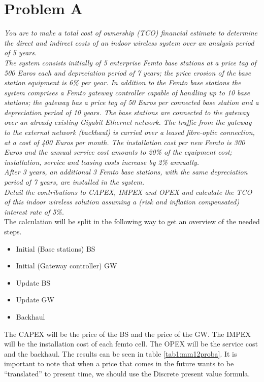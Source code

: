 \section{Problem A}
\textit{You are to make a total cost of ownership (TCO) financial estimate to determine the direct and indirect costs of an indoor wireless system over an analysis period of 5 years.}\\

\textit{The system consists initially of 5 enterprise Femto base stations at a price tag of 500 Euros each and depreciation period of 7 years; the price erosion of the base station equipment is 6\% per year. In addition to the Femto base stations the system comprises a Femto gateway controller capable of handling up to 10 base stations; the gateway has a price tag of 50 Euros per connected base station and a depreciation period of 10 years. The base stations are connected to the gateway over an already existing Gigabit Ethernet network. The traffic from the gateway to the external network (backhaul) is carried over a leased fibre-optic connection, at a cost of 400 Euros per month. The installation cost per new Femto is 300 Euros and the annual service cost amounts to 20\% of the equipment cost; installation, service and leasing costs increase by 2\% annually.}\\
\textit{After 3 years, an additional 3 Femto base stations, with the same depreciation period of 7 years, are installed in the system.}\\
\textit{Detail the contributions to CAPEX, IMPEX and OPEX and calculate the TCO of this indoor wireless solution assuming a (risk and inflation compensated) interest rate of 5\%.}\\

The calculation will be split in the following way to get an overview of the needed steps.
\begin{itemize}
 \item Initial (Base stations) BS
 \item Initial (Gateway controller) GW
 \item Update BS
 \item Update GW
 \item Backhaul
\end{itemize}

The CAPEX will be the price of the BS and the price of the GW. The IMPEX will be the installation cost of each femto cell. The OPEX will be the service cost and the backhaul. The results can be seen in table \ref{tab1:mm12proba}. It is important to note that when a price that comes in the future wants to be ``translated'' to present time, we should use the Discrete present value formula.

